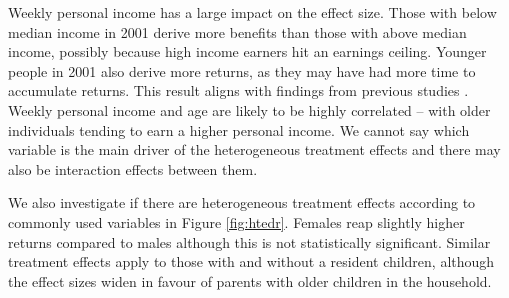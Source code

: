 \documentclass[12pt, a4paper]{article}
\begin{document}
Weekly personal income has a large impact on the effect size. Those with below
median income in 2001 derive more benefits than those with above median income,
possibly because high income earners hit an earnings ceiling. Younger people in
2001 also derive more returns, as they may have had more time to accumulate
returns. This result aligns with findings from previous studies
\citep{polidano2016,dorsett2016,perales2017}. Weekly personal income and age
are likely to be highly correlated -- with older individuals tending to earn a
higher personal income. We cannot say which variable is the main driver of the
heterogeneous treatment effects and there may also be interaction effects between them.

We also investigate if there are heterogeneous treatment effects according to
commonly used variables in Figure \ref{fig:htedr}. Females reap slightly higher
returns compared to males although this is not statistically significant.
Similar treatment effects apply to those with and without a resident children,
although the effect sizes widen in favour of parents with older children in the
household. 
%
\
%
\end{document}
